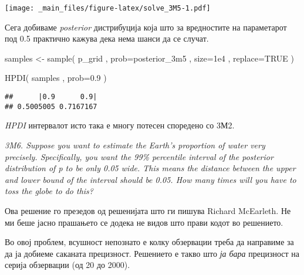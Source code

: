 \documentclass[
]{book}
\newenvironment{Shaded}{\begin{snugshade}}{\end{snugshade}}
\newcommand{\AttributeTok}[1]{\textcolor[rgb]{0.77,0.63,0.00}{#1}}
\newcommand{\ConstantTok}[1]{\textcolor[rgb]{0.00,0.00,0.00}{#1}}
\newcommand{\FloatTok}[1]{\textcolor[rgb]{0.00,0.00,0.81}{#1}}
\newcommand{\FunctionTok}[1]{\textcolor[rgb]{0.00,0.00,0.00}{#1}}
\newcommand{\NormalTok}[1]{#1}
\newcommand{\OtherTok}[1]{\textcolor[rgb]{0.56,0.35,0.01}{#1}}
\begin{document}
\texttt{[image: \_main\_files/figure-latex/solve\_3M5-1.pdf]}

Сега добиваме \emph{posterior} дистрибуција која што за вредностите на параметарот под 0.5 практично кажува дека нема шанси да се случат.

\begin{Shaded}
\begin{Highlighting}[]
\NormalTok{samples }\OtherTok{\textless{}{-}} \FunctionTok{sample}\NormalTok{( p\_grid , }\AttributeTok{prob=}\NormalTok{posterior\_3m5 , }\AttributeTok{size=}\FloatTok{1e4}\NormalTok{ , }\AttributeTok{replace=}\ConstantTok{TRUE}\NormalTok{ )}

\FunctionTok{HPDI}\NormalTok{( samples , }\AttributeTok{prob=}\FloatTok{0.9}\NormalTok{ )}
\end{Highlighting}
\end{Shaded}

\begin{verbatim}
##      |0.9      0.9| 
## 0.5005005 0.7167167
\end{verbatim}

\emph{HPDI} интервалот исто така е многу потесен споредено со 3М2.

\emph{3M6. Suppose you want to estimate the Earth's proportion of water very precisely. Specifically, you want the 99\% percentile interval of the posterior distribution of p to be only 0.05 wide. This means the distance between the upper and lower bound of the interval should be 0.05. How many times will you have to toss the globe to do this?}

Ова решение го презедов од решенијата што ги пишува Richard McEarleth. Не ми беше јасно прашањето се додека не видов што прави кодот во решението.

Во овој проблем, всушност непознато е колку обзервации треба да направиме за да ја добиеме саканата прецизност. Решението е такво што \emph{ја бара} прецизност на серија обзервации (од 20 до 2000).
\end{document}
